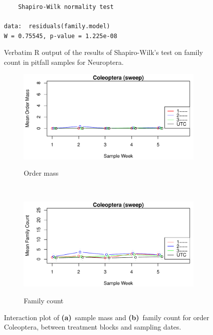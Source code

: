 \documentclass[10pt,letterpaper,twocolumn]{article}
\begin{document}
\begin{figure}[h]
	\lstset{numbers=left}
	\lstset{xleftmargin=5mm,framexleftmargin=5mm}
	\begin{lstlisting}
	Shapiro-Wilk normality test

data:  residuals(family.model)
W = 0.75545, p-value = 1.225e-08
	\end{lstlisting}
	\caption{Verbatim R output of the results of Shapiro-Wilk's test on family count in pitfall samples for Neuroptera.}
	\label{fig:pitfall_neuroptera_family_shapiro}
	\smallskip
	\nointerlineskip
	\hrulefill
\end{figure}

\begin{figure}[h]
	\centering
	\begin{subfigure}[b]{0.45\textwidth}
		\caption{Order mass}
		\includegraphics[width=\textwidth]{plots/blocks/interaction/mass/mass_sweep_Coleoptera_interplot.pdf}
		\label{fig:sweep_coleoptera_mass_interplot}
	\end{subfigure}
	~
	\begin{subfigure}[b]{0.45\textwidth}
		\caption{Family count}
		\includegraphics[width=\textwidth]{plots/blocks/interaction/family/family_sweep_Coleoptera_interplot.pdf}
		\label{fig:sweep_coleoptera_family_interplot}
	\end{subfigure}
	\caption{Interaction plot of \textbf{(a)}~sample mass and \textbf{(b)}~family count for order Coleoptera, between treatment blocks and sampling dates.}
	\label{fig:sweep_coleoptera_interplot}
	\smallskip
	\nointerlineskip
	\hrulefill
\end{figure}
\end{document}
